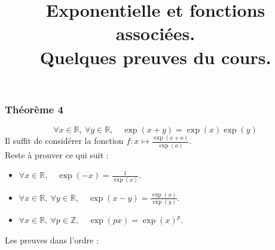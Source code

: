 \documentclass[10pt]{article}
\title{\huge\textbf{Exponentielle et fonctions associées.\\ Quelques preuves du cours.}}
\date{}
\begin{document}
    \maketitle
    \subsubsection*{Théorème 4}
    \begin{equation}
        \boxed{\forall x\in \mathbb{R},\ \forall y\in\mathbb{R},\quad  \exp(x+y)=\exp(x)\exp(y)}
    \end{equation}
    Il suffit de considérer la fonction $f:x\mapsto \frac{\exp(x+a)}{\exp(a)}$.\\
    Reste à prouver ce qui suit :
    \begin{itemize}
        \item \(\forall x\in\mathbb{R},\quad \exp(-x)=\frac1{\exp(x)}\).
        \item \(\forall x\in \mathbb{R},\ \forall y\in\mathbb{R},\quad \exp(x-y)=\frac{\exp(x)}{\exp(y)}\).
        \item \(\forall x\in\mathbb{R},\ \forall p\in\mathbb{Z},\quad \exp(px)=\exp(x)^p\).
    \end{itemize}
    Les preuves dans l'ordre :
\end{document}
